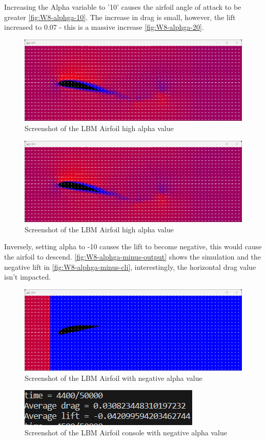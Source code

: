 Increasing the Alpha variable to '10' causes the airfoil angle of attack to be greater \autoref{fig:W8-alphga-10}. The increase in drag is small, however, the lift increased to 0.07 - this is a massive increase \autoref{fig:W8-alphga-20}.

\begin{figure}[H] 
    \centering
    \includegraphics[width=0.49\columnwidth]{Figures/Week 8/alpha 10 1.png}
    \caption{Screenshot of the LBM Airfoil high alpha value}
    \label{fig:W8-alphga-10}
\end{figure}
\begin{figure}[H] 
    \centering
    \includegraphics[width=0.49\columnwidth]{Figures/Week 8/alpha 10 1.png}
    \caption{Screenshot of the LBM Airfoil high alpha value}
    \label{fig:W8-alphga-20}
\end{figure}


Inversely, setting alpha to -10 causes the lift to become negative, this would cause the airfoil to descend. \autoref{fig:W8-alphga-minus-output} shows the simulation and the negative lift in \autoref{fig:W8-alphga-minus-cli}, interestingly, the horizontal drag value isn't impacted. 
\begin{figure}[H] 
    \centering
    \includegraphics[width=0.49\columnwidth]{Figures/Week 8/neg sim.png}
    \caption{Screenshot of the LBM Airfoil with negative alpha value}
    \label{fig:W8-alphga-minus-output}
\end{figure}
\begin{figure}[H] 
    \centering
    \includegraphics[width=0.49\columnwidth]{Figures/Week 8/neg cli.png}
    \caption{Screenshot of the LBM Airfoil console with negative alpha value }
    \label{fig:W8-alphga-minus-cli}
\end{figure}


